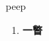 
\begin{frame}
{\huge peep}
\begin{center}
\begin{enumerate}\Large
  \item \textbf{一瞥}
\end{enumerate}
\end{center}
\end{frame}
